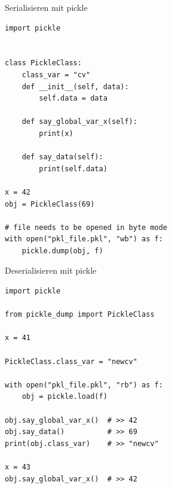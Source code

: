 \documentclass[12pt, aspectratio=169, usepdftitle=false]{beamer}
\begin{document}
\begin{frame}[fragile]{Serialisieren mit pickle}
	\begin{lstlisting}[language=pytiny]
import pickle


class PickleClass:
    class_var = "cv"
    def __init__(self, data):
        self.data = data

    def say_global_var_x(self):
        print(x)

    def say_data(self):
        print(self.data)

x = 42
obj = PickleClass(69)

# file needs to be opened in byte mode
with open("pkl_file.pkl", "wb") as f:
    pickle.dump(obj, f)		
	\end{lstlisting}
\end{frame}


\begin{frame}[fragile]{Deserialisieren mit pickle}
	\begin{lstlisting}[language=pytiny]
import pickle

from pickle_dump import PickleClass

x = 41

PickleClass.class_var = "newcv"

with open("pkl_file.pkl", "rb") as f:
    obj = pickle.load(f)

obj.say_global_var_x()  # >> 42
obj.say_data()          # >> 69
print(obj.class_var)    # >> "newcv"

x = 43
obj.say_global_var_x()  # >> 42
		
	\end{lstlisting}
\end{frame}
\end{document}
